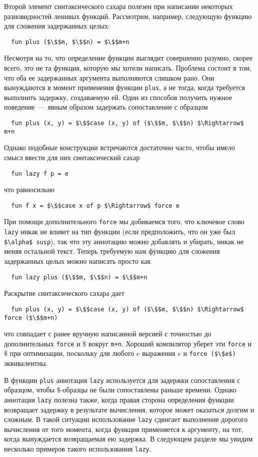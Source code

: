 Второй элемент синтаксического сахара полезен при написании некоторых
разновидностей ленивых функций. Рассмотрим, например, следующую
функцию для сложения задержанных целых:
\begin{lstlisting}
  fun plus ($\$$m, $\$$n) = $\$$m+n
\end{lstlisting}
Несмотря на то, что определение функции выглядит совершенно разумно,
скорее всего, это не та функция, которую мы хотели написать. Проблема
состоит в том, что оба ее задержанных аргумента выполняются слишком
рано.  Они вынуждаются в момент применения функции
\lstinline!plus!, а не тогда, когда требуется выполнить задержку,
создаваемую ей.  Один из способов получить нужное
поведение~--- явным образом задержать сопоставление с образцом
\begin{lstlisting}
  fun plus (x, y) = $\$$case (x, y) of ($\$$m, $\$$n) $\Rightarrow$ m+n
\end{lstlisting}
Однако подобные конструкции встречаются достаточно часто, чтобы
имело смысл ввести для них синтаксический сахар
\begin{lstlisting}
  fun lazy f p = e
\end{lstlisting}
что равносильно
\begin{lstlisting}
  fun f x = $\$$case x of p $\Rightarrow$ force e
\end{lstlisting}
При помощи дополнительного \lstinline!force! мы добиваемся того, что
ключевое слово \lstinline!lazy! никак не влияет на тип функции (если
предположить, что он уже был \lstinline!$\alpha$ susp!), так что эту
аннотацию можно добавлять и убирать, никак не меняя остальной
текст. Теперь требуемую нам функцию для сложения задержанных целых
можно написать просто как
\begin{lstlisting}
  fun lazy plus ($\$$m, $\$$n) = $\$$m+n
\end{lstlisting}
Раскрытие синтаксического сахара дает
\begin{lstlisting}
  fun plus (x, y) = $\$$case (x, y) of ($\$$m, $\$$n) $\Rightarrow$ force ($\$$m+n)
\end{lstlisting}
что совпадает с ранее вручную написанной версией с
точностью до дополнительных \lstinline!force! и $\$$ вокруг
\lstinline!m+n!. Хороший компилятор уберет эти \lstinline!force! и
$\$$ при оптимизации, поскольку для любого $e$ выражения $e$ и 
\lstinline!force ($\$e$)! эквивалентны.

В функции \lstinline!plus! аннотация \lstinline!lazy! используется для
задержки сопоставления с образцом, чтобы $\$$-образцы не были
сопоставлены раньше времени. Однако аннотация \lstinline!lazy! полезна
также, когда правая сторона определения функции возвращает задержку
в результате вычисления, которое может оказаться долгим и 
сложным.  В такой ситуации использование \lstinline!lazy! сдвигает
выполнение дорогого вычисления от того момента, когда функция
применяется к аргументу, на тот, когда вынуждается возвращаемая ею
задержка. В следующем разделе мы увидим несколько
примеров такого использования \lstinline!lazy!.


